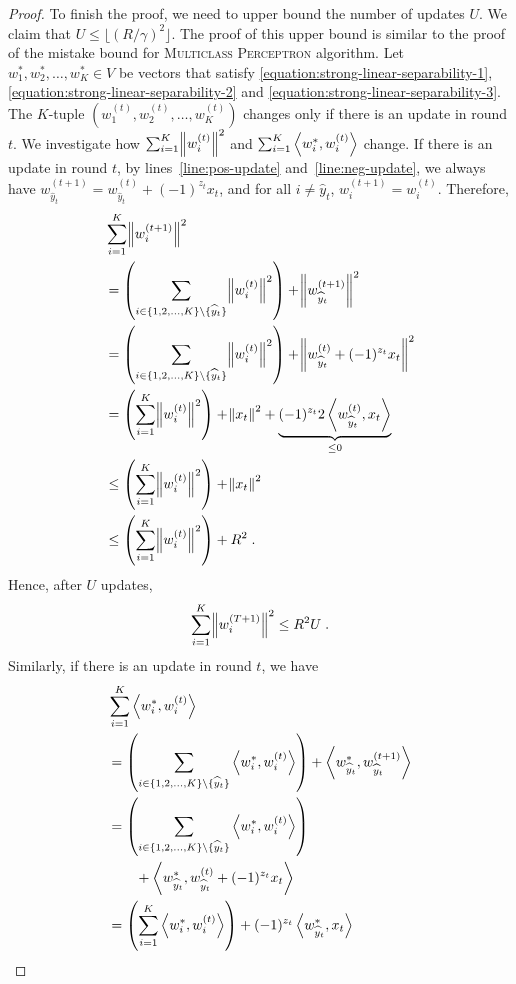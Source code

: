 \begin{proof}
To finish the proof, we need to upper bound the number of updates $U$. We claim
that $U \le \lfloor (R/\gamma)^2 \rfloor$. The proof of this upper bound is
similar to the proof of the mistake bound for \textsc{Multiclass Perceptron}
algorithm. Let $w_1^*, w_2^*, \dots, w_K^* \in V$ be vectors that satisfy
\eqref{equation:strong-linear-separability-1},
\eqref{equation:strong-linear-separability-2} and
\eqref{equation:strong-linear-separability-3}.
The $K$-tuple $(w_1^{(t)}, w_2^{(t)}, \dots, w_K^{(t)})$
changes only if there is an update in round $t$.
We investigate how $\sum_{i=1}^K \norm{w_i^{(t)}}^2$ and
$\sum_{i=1}^K \left\langle w_i^*, w_i^{(t)} \right\rangle$ change. If there is an update in round $t$,
by lines~\ref{line:pos-update} and~\ref{line:neg-update}, we always have
$ w_{\widehat y_t}^{(t+1)} = w_{\widehat y_t}^{(t)} + (-1)^{z_t} x_t $,
and for all $i \neq \widehat y_t$, $w_{i}^{(t+1)} = w_{i}^{(t)}$.
Therefore,
\begingroup
\allowdisplaybreaks
\begin{align*}
& \sum_{i=1}^K \norm{w_i^{(t+1)}}^2 \\
& = \left( \sum_{i \in \{1,2,\dots,K\} \setminus \{\widehat y_t\}} \norm{w_i^{(t)}}^2 \right) + \norm{w_{\widehat y_t}^{(t+1)}}^2 \\
& = \left( \sum_{i \in \{1,2,\dots,K\} \setminus \{\widehat y_t\}} \norm{w_i^{(t)}}^2 \right) + \norm{w_{\widehat y_t}^{(t)} + (-1)^{z_t} x_t}^2 \\
& = \left( \sum_{i=1}^K \norm{w_i^{(t)}}^2 \right) + \norm{x_t}^2 + \underbrace{(-1)^{z_t} 2 \left\langle w_{\widehat y_t}^{(t)}, x_t \right\rangle}_{\le 0} \\
& \le \left( \sum_{i=1}^K \norm{w_i^{(t)}}^2 \right) + \norm{x_t}^2 \\
& \le \left( \sum_{i=1}^K \norm{w_i^{(t)}}^2 \right) + R^2 \; .
\end{align*}
\endgroup
Hence, after $U$ updates,
$$
\sum_{i=1}^K \norm{w_i^{(T+1)}}^2 \le R^2 U \; .
$$
Similarly, if there is an update in round $t$, we have
\begin{align*}
& \sum_{i=1}^K \ip{w_i^*}{w_i^{(t)}} \\
& = \left( \sum_{i \in \{1,2,\dots,K\} \setminus \{\widehat y_t\}} \ip{w_i^*}{w_i^{(t)}} \right) + \ip{w_{\widehat y_t}^*}{w_{\widehat y_t}^{(t+1)}} \\
& = \left( \sum_{i \in \{1,2,\dots,K\} \setminus \{\widehat y_t\}} \ip{w_i^*}{w_i^{(t)}} \right) \\
& \qquad + \ip{w_{\widehat y_t}^*}{w_{\widehat y_t}^{(t)} + (-1)^{z_t} x_t} \\
& = \left( \sum_{i=1}^K \ip{w_i^*}{w_i^{(t)}} \right) + (-1)^{z_t} \ip{w_{\widehat y_t}^*}{x_t} \\

\end{align*}
\end{proof}
